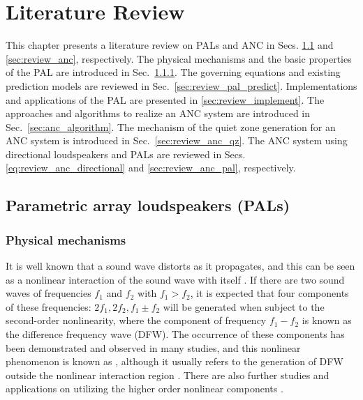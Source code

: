 \chapter{Literature Review} %

\label{chap:review} %

This chapter presents a literature review on PALs and ANC in Secs.  \ref{sec:literature_pal} and \ref{sec:review_anc}, respectively.
The physical mechanisms and the basic properties of the PAL are introduced in Sec.~\ref{sec:literature_pal_phys}.
The governing equations and existing prediction models are reviewed in Sec.~\ref{sec:review_pal_predict}.
Implementations and applications of the PAL are presented in \ref{sec:review_implement}.
The approaches and algorithms to realize an ANC system are introduced in Sec.~\ref{sec:anc_algorithm}.
The mechanism of the quiet zone generation for an ANC system is introduced in Sec.~\ref{sec:review_anc_qz}.
The ANC system using directional loudspeakers and PALs are reviewed in Secs. \ref{eq:review_anc_directional} and \ref{sec:review_anc_pal}, respectively.

\section{Parametric array loudspeakers (PALs)}
\label{sec:literature_pal}

\subsection{Physical mechanisms}
\label{sec:literature_pal_phys}
It is well known that a sound wave distorts as it propagates, and this can be seen as a nonlinear interaction of the sound wave with itself \cite{Hamilton2008NonlinearAcoustics}. 
If there are two sound waves of frequencies $f_1$ and $f_2$ with $f_1>f_2$, it is expected that four components of these frequencies: $2f_1, 2f_2,f_1\pm f_2$ {will be generated when} subject to the second-order nonlinearity, where the component of frequency $f_1-f_2$ is known as the difference frequency wave (DFW). 
The occurrence of these components has been demonstrated and observed in many studies, and this nonlinear phenomenon is known as , although it usually refers to the generation of DFW outside the nonlinear interaction region \cite{Ingard1956ScatteringSoundSound, Westervelt1957ScatteringSoundSound, Westervelt1957ScatteringSoundSounda, Bellin1960ScatteringSoundSound, Darvennes1990ScatteringSoundSound, Dimant2021LensMediatedScattering}. 
There are also further studies and applications on utilizing the higher order nonlinear components \cite{Qian1995NonlinearAcousticsHigherorder, Ma2006ThirdOrderHarmonic, Liu2007TheoreticalExperimentalStudy, Mitri2010NonlinearAcousticsHigherorder, Garner2012ThirdorderParametricArray, Johnson2014EfficientApproachComputing, Garner2011DesignOptimalDirectional}.

